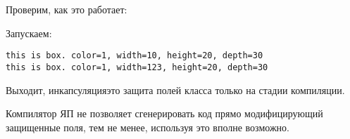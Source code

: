 Проверим, как это работает:



Запускаем:

\begin{lstlisting}
this is box. color=1, width=10, height=20, depth=30
this is box. color=1, width=123, height=20, depth=30
\end{lstlisting}

Выходит, инкапсуляция\EMDASH{}это защита полей класса только на стадии компиляции.

Компилятор ЯП \Cpp не позволяет сгенерировать код прямо
модифицирующий защищенные поля, тем не менее, используя \EMDASH{} 
это вполне возможно.


